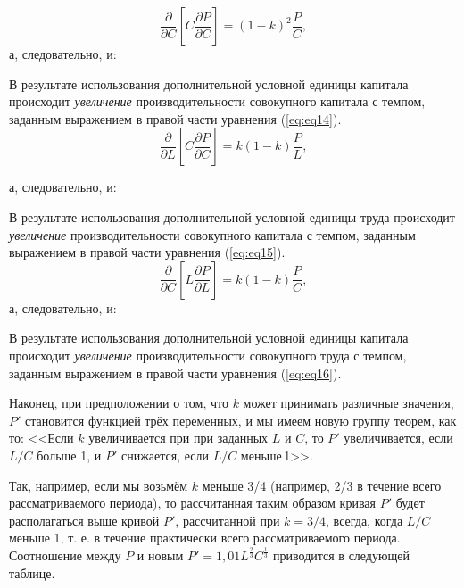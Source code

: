 \documentclass[leqno]{article}  %
\begin{document}
\begin{equation}
\label{eq:eq14}
\frac{\partial}{\partial C}\!\left[C \frac{\partial P}{\partial C}\right]=(1-k)^2\frac{P}{C},
\end{equation}
а, следовательно, и:
\par
В результате использования дополнительной условной единицы капитала происходит \emph{увеличение} производительности совокупного капитала с темпом, заданным выражением в правой части уравнения (\ref{eq:eq14}).
\begin{equation}
\label{eq:eq15}
\frac{\partial}{\partial L}\!\left[C \frac{\partial P}{\partial C}\right]=k(1-k)\frac{P}{L},
\end{equation}
\par
а, следовательно, и:
\par
В результате использования дополнительной условной единицы труда происходит \emph{увеличение} производительности совокупного капитала с темпом, заданным выражением в правой части уравнения (\ref{eq:eq15}).
\begin{equation}
\label{eq:eq16}
\frac{\partial}{\partial C}\!\left[L \frac{\partial P}{\partial L}\right]=k(1-k)\frac{P}{C},
\end{equation}
а, следовательно, и:
\par
В результате использования дополнительной условной единицы капитала происходит \emph{увеличение} производительности совокупного труда с темпом, заданным выражением в правой части уравнения (\ref{eq:eq16}).
\par
Наконец, при предположении о том, что \(k\) может принимать различные значения, \(P'\) становится функцией трёх переменных, и мы имеем новую группу теорем, как то: <<Если \(k\) увеличивается при при заданных \(L\) и \(C\), то \(P'\) увеличивается, если \(L / C\) больше 1, и \(P'\) снижается, если \(L / C\) меньше\,1>>.
\par
Так, например, если мы возьмём \(k\) меньше 3/4 (например, 2/3 в течение всего рассматриваемого периода), то рассчитанная таким образом кривая \(P'\) будет располагаться выше кривой \(P'\), рассчитанной при \(k=3/4\), всегда, когда \(L / C\) меньше 1, т. е. в течение практически всего рассматриваемого периода. Соотношение между \(P\) и новым \(P'=1,01L^{\frac23}C^{\frac13}\) приводится в следующей таблице.
\par
\end{document}
